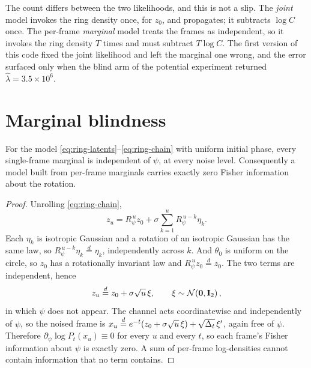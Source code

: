 \begin{pitfall}
The count differs between the two likelihoods, and this is not a slip. The \emph{joint} model
invokes the ring density once, for $z_0$, and propagates; it subtracts $\log C$ once. The
per-frame \emph{marginal} model treats the frames as independent, so it invokes the ring density
$T$ times and must subtract $T\log C$. The first version of this code fixed the joint likelihood
and left the marginal one wrong, and the error surfaced only when the blind arm of the potential
experiment returned $\hat\lambda = 3.5\times10^{6}$.
\end{pitfall}

\section{Marginal blindness}
\label{sec:blindness}

\begin{theorem}
\label{thm:ring-blind}
For the model \eqref{eq:ring-latents}--\eqref{eq:ring-chain} with uniform initial phase, every
single-frame marginal is independent of $\psi$, at every noise level. Consequently a model built
from per-frame marginals carries exactly zero Fisher information about the rotation.
\end{theorem}

\begin{proof}
Unrolling \eqref{eq:ring-chain},
\[
z_u = R_\psi^{\,u} z_0 + \sigma\sum_{k=1}^{u} R_\psi^{\,u-k}\eta_k .
\]
Each $\eta_k$ is isotropic Gaussian and a rotation of an isotropic Gaussian has the same law, so
$R_\psi^{\,u-k}\eta_k \overset{d}{=} \eta_k$, independently across $k$. And $\theta_0$ is uniform
on the circle, so $z_0$ has a rotationally invariant law and $R_\psi^{\,u}z_0 \overset{d}{=} z_0$.
The two terms are independent, hence
\begin{equation}
\label{eq:blind-law}
z_u \overset{d}{=} z_0 + \sigma\sqrt{u}\,\xi,
\qquad \xi\sim\mathcal{N}\!\left(\mathbf{0},\mathbf{I}_2\right),
\end{equation}
in which $\psi$ does not appear. The channel acts coordinatewise and independently of $\psi$, so
the noised frame is $x_u \overset{d}{=} e^{-t}(z_0 + \sigma\sqrt u\,\xi) + \sqrt{\Delta_t}\,\xi'$,
again free of $\psi$. Therefore $\partial_\psi \log P_t(x_u) \equiv 0$ for every $u$ and every
$t$, so each frame's Fisher information about $\psi$ is exactly zero. A sum of per-frame
log-densities cannot contain information that no term contains.
\end{proof}

